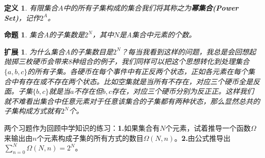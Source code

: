 \documentclass[mathserif,hyperref,UTF8,openany,b5paper]{ctexbook}
\newtheorem{defn}{定义}[section]
\newtheorem{pro}{命题}[section]
\newtheorem{kuo}{扩展}[section]
\begin{document}
\begin{defn}
有限集合$A$中的所有子集构成的集合我们将其称之为\textbf{幂集合(Power Set)}，记作$2^A$。
\end{defn}
\begin{pro}
集合A的子集数是$2^N$，其中$N$是A集合中元素的个数。
\end{pro}
\begin{kuo}
为什么集合A的子集数目是$2^N$？每当我看到这样的问题，我总是会回想起抛掷三枚硬币会带来8种组合的例子，我们同样可以把这个思想转化到处理集合$\{a,b,c\}$的所有子集。各硬币在每个事件中有正反两个状态，正如各元素在每个集合中有存在或不存在两个状态。比如空集就是当所有不存在，对应三个硬币全是反面。子集$\{b,c\}$就是当$a$不存在但$b,c$存在，对应三个硬币分别为反正正。这样我们就不难看出集合中任意元素对于任意该集合的子集都有两种状态，那么显然总共的子集构成方式就有$2^N$个。
\end{kuo}
两个习题作为回顾中学知识的练习：\textbf{1.}如果集合有$N$个元素，试着推导一个函数$\Omega$来输出由$n$个元素构成子集的所有方式的数目$\Omega(N,n)$。\textbf{2.}由公式推导出 $\sum_{n=0}^{N}\Omega(N,n) = 2^N$。
\end{document}
